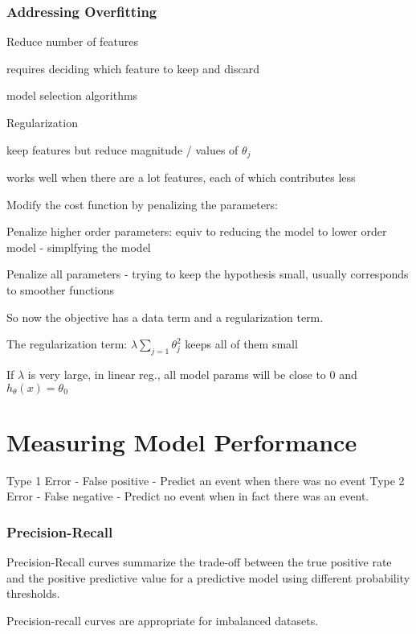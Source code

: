 {{{{\subsubsection{Addressing Overfitting}

Reduce number of features

\item requires deciding which feature to keep and discard
\item model selection algorithms

Regularization

\item keep features but reduce magnitude / values of $\theta_j$ 
\item works well when there are a lot features, each of which contributes less

Modify the cost function by penalizing the parameters:

Penalize higher order parameters: equiv to reducing the model to lower order model - simplfying the model

Penalize all parameters  - trying to keep the hypothesis small, usually corresponds to smoother functions

So now the objective has a data term and a regularization term.

The regularization term: $\lambda\sum_{j=1} \theta_j^2 $ keeps all of them small

If $\lambda $ is very large, in linear reg., all model params will be close to 0 and $h_\theta(x) = \theta_0$  


\section{Measuring Model Performance}

Type 1 Error - False positive - Predict an event when there was no event
Type 2 Error - False negative - Predict no event when in fact there was an event.

\subsubsection{Precision-Recall}

Precision-Recall curves summarize the trade-off between the true positive rate and the positive predictive value for a predictive model using different probability thresholds.

Precision-recall curves are appropriate for imbalanced datasets.

}}}}
